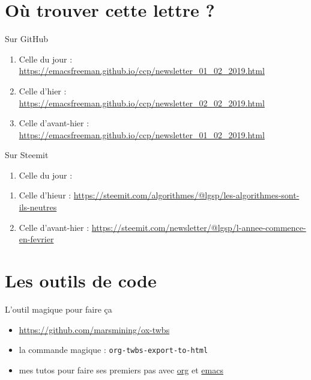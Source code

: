 \documentclass[presentation]{beamer}
\begin{document}
\section{Où trouver cette lettre ?}
\label{sec:org5d44bfa}
\begin{frame}[label={sec:org9ced8ab}]{Sur GitHub}
\begin{enumerate}
\item Celle du jour :
\url{https://emacsfreeman.github.io/ccp/newsletter\_01\_02\_2019.html}

\item Celle d'hier :
\url{https://emacsfreeman.github.io/ccp/newsletter\_02\_02\_2019.html}

\item Celle d'avant-hier :
\url{https://emacsfreeman.github.io/ccp/newsletter\_01\_02\_2019.html}
\end{enumerate}
\end{frame}

\begin{frame}[label={sec:org60f0415}]{Sur Steemit}
\begin{enumerate}
\item Celle du jour :
\end{enumerate}


\begin{enumerate}
\item Celle d'hieur :
\url{https://steemit.com/algorithmes/@lgsp/les-algorithmes-sont-ils-neutres}

\item Celle d'avant-hier :
\url{https://steemit.com/newsletter/@lgsp/l-annee-commence-en-fevrier}
\end{enumerate}
\end{frame}

\section{Les outils de code}
\label{sec:org6378fe7}
\begin{frame}[fragile,label={sec:orga2a339f}]{L'outil magique pour faire ça}
 \begin{itemize}
\item \url{https://github.com/marsmining/ox-twbs}
\item la commande magique : \texttt{org-twbs-export-to-html}
\item mes tutos pour faire ses premiers pas avec \href{https://www.youtube.com/playlist?list=PLUJNJAesbJGWi3dXmGljFTXCPt-ntQFco}{org} et \href{https://www.youtube.com/playlist?list=PLUJNJAesbJGXZHtC\_bTUOCwB\_qkfbdHpZ}{emacs}
\end{itemize}
\end{frame}
\end{document}
